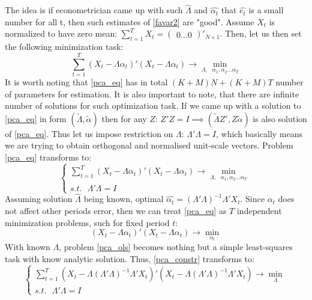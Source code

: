 \documentclass[a4paper, 14pt]{article}
\begin{document}
The idea is if econometrician came up with such $\hat{\Lambda}$ and $\hat{\alpha_t}$ that $\hat{e_t}$ is a small number for all t, then such estimates of \eqref{favar2} are "good". Assume $X_t$ is normalized to have zero mean: $\sum_{t=1}^{T} X_t = \begin{pmatrix} 
0 \dots 0
\end{pmatrix}'_{N \times 1}$. \noindent Then, let us then set the following minimization task: 
\begin{equation}\label{pca_eq}
\sum_{t=1}^{T} (X_t - \Lambda \alpha_t)'(X_t - \Lambda \alpha_t) \rightarrow \min_{\Lambda,\text{ } \alpha_1, \alpha_2 \dotsc \alpha_T} 
\end{equation}
It is worth noting that \eqref{pca_eq} has in total $(K+M)  N+ (K+M) T$ number of parameters for estimation. It is also important to note, that there are infinite number of solutions for such optimization task. If we came up with a solution to \eqref{pca_eq} in form $(\tilde{\Lambda}, \widetilde{\alpha})$ then for any $Z$: $Z'Z=I \implies (\tilde{\Lambda} Z',Z\widetilde{\alpha})$ is also solution of \eqref{pca_eq}. Thus let us impose restriction on $\Lambda$: $\Lambda'\Lambda = I$, which basically means we are trying to obtain orthogonal  and normalised unit-scale vectors. Problem \eqref{pca_eq} transforms to: 
\begin{equation}\label{pca_constr}
	\begin{cases}
		\sum_{t=1}^{T} (X_t - \Lambda \alpha_t)'(X_t - \Lambda \alpha_t) \rightarrow \min_{\Lambda,\text{ } \alpha_1, \alpha_2 \dotsc \alpha_T} \\
		s.t. \text{ } \Lambda'\Lambda = I
	\end{cases}
\end{equation}
Assuming solution $\hat{\Lambda}$ being known, optimal $\hat{\alpha_t} = (\Lambda' \Lambda)^{-1}\Lambda'X_t$. Since $\alpha_t$ does not affect other periods error, then we  can treat \eqref{pca_eq} as $T$ independent minimization problems, such for fixed period $t$: 
\begin{equation} \label{pca_ols}
(X_t - \Lambda \alpha_t)'(X_t - \Lambda \alpha_t) \rightarrow \min_{ \alpha_t}
\end{equation}
With known $\Lambda$, problem \eqref{pca_ols} becomes nothing but a simple least-squares task with know analytic solution. Thus, \eqref{pca_constr} transforms to:
\begin{equation}
	\begin{cases}
	\sum_{t=1}^{T} (X_t - \Lambda (\Lambda' \Lambda)^{-1}\Lambda'X_t)'(X_t - \Lambda (\Lambda' \Lambda)^{-1}\Lambda'X_t) \rightarrow \min_{\Lambda} \\
	s.t. \text{ } \Lambda'\Lambda = I
	\end{cases}
\end{equation}
\end{document}
